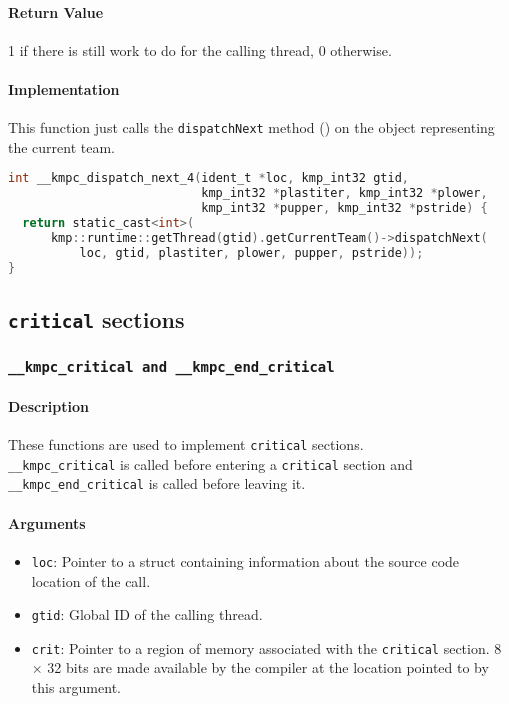 \paragraph{Return Value} 1 if there is still work to do for the calling thread, 0 otherwise.

\paragraph{Implementation} This function just calls the \texttt{dispatchNext} method () on
the object representing the current team.

\begin{lstlisting}[language=C, caption={__kmpc_dispatch_next_4},
                   label={lst:kmpc-dispatch-next-4}, escapechar=@]
int __kmpc_dispatch_next_4(ident_t *loc, kmp_int32 gtid,
                           kmp_int32 *plastiter, kmp_int32 *plower,
                           kmp_int32 *pupper, kmp_int32 *pstride) {
  return static_cast<int>(
      kmp::runtime::getThread(gtid).getCurrentTeam()->dispatchNext(
          loc, gtid, plastiter, plower, pupper, pstride));
}
\end{lstlisting}

\subsection{\texttt{critical} sections}

\subsubsection{\texttt{__kmpc_critical and __kmpc_end_critical}}

\paragraph{Description} These functions are used to implement \texttt{critical} sections.\\
\texttt{\_\_kmpc\_critical} is called before entering a \texttt{critical} section and
\texttt{\_\_kmpc\_end\_critical} is called before leaving it.

\paragraph{Arguments}
\begin{itemize}
	\item \texttt{loc}: Pointer to a struct containing information about the source code location
	      of the call.
	\item \texttt{gtid}: Global ID of the calling thread.
	\item \texttt{crit}: Pointer to a region of memory associated with the \texttt{critical} section. 8
	      $\times$ 32 bits are made available by the compiler at the location pointed to by this
	      argument.
\end{itemize}

